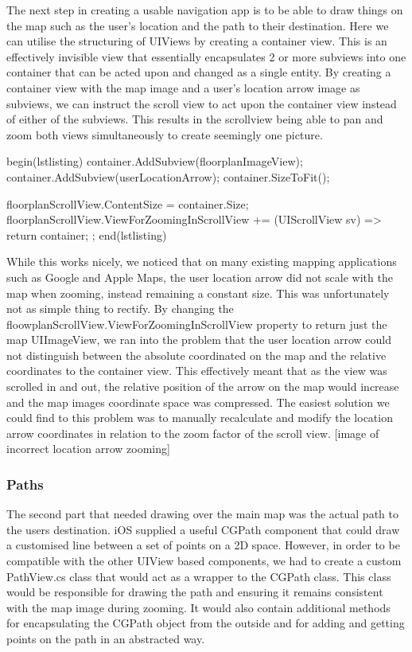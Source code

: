 \documentclass[main.tex]{subfiles}
\begin{document}
The next step in creating a usable navigation app is to be able to draw things on the map such as the user's location and the path to their destination. Here we can utilise the structuring of UIViews by creating a container view. This is an effectively invisible view that essentially encapsulates 2 or more subviews into one container that can be acted upon and changed as a single entity. By creating a container view with the map image and a user's location arrow image as subviews, we can instruct the scroll view to act upon the container view instead of either of the subviews. This results in the scrollview being able to pan and zoom both views simultaneously to create seemingly one picture. 

begin(lstlisting)
container.AddSubview(floorplanImageView);
container.AddSubview(userLocationArrow);
container.SizeToFit();

floorplanScrollView.ContentSize = container.Size;
floorplanScrollView.ViewForZoomingInScrollView += (UIScrollView sv) => { return container; };
end(lstlisting)

While this works nicely, we noticed that on many existing mapping applications such as Google and Apple Maps, the user location arrow did not scale with the map when zooming, instead remaining a constant size. This was unfortunately not as simple thing to rectify. By changing the floowplanScrollView.ViewForZoomingInScrollView property to return just the map UIImageView, we ran into the problem that the user location arrow could not distinguish between the absolute coordinated on the map and the relative coordinates to the container view. This effectively meant that as the view was scrolled in and out, the relative position of the arrow on the map would increase and the map images coordinate space was compressed. The easiest solution we could find to this problem was to manually recalculate and modify the location arrow coordinates in relation to the zoom factor of the scroll view.
[image of incorrect location arrow zooming]

\subsubsection{Paths}

The second part that needed drawing over the main map was the actual path to the users destination. iOS supplied a useful CGPath component that could draw a customised line between a set of points on a 2D space. However, in order to be compatible with the other UIView based components, we had to create a custom PathView.cs class that would act as a wrapper to the CGPath class. This class would be responsible for drawing the path and ensuring it remains consistent with the map image during zooming. It would also contain additional methods for encapsulating the CGPath object from the outside and for adding and getting points on the path in an abstracted way. 
\end{document}
